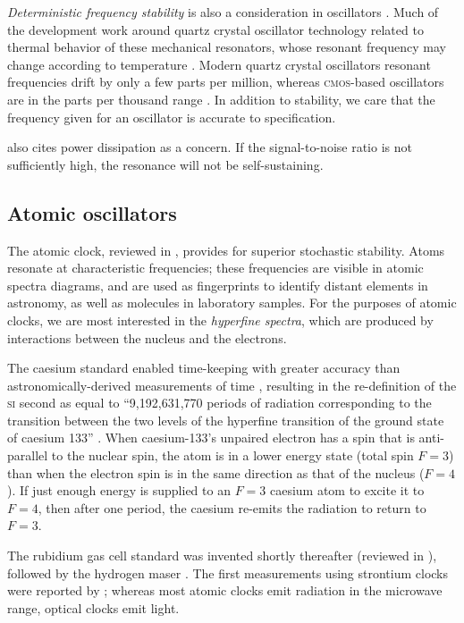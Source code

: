 \documentclass[12pt]{article}
\begin{document}
\textit{Deterministic frequency stability} is also a consideration in oscillators \citep{VanBeek2012}. Much of the development work around quartz crystal oscillator technology related to thermal behavior of these mechanical resonators, whose resonant frequency may change according to temperature \citep{Frerking1996}. Modern quartz crystal oscillators resonant frequencies drift by only a few parts per million, whereas \textsc{cmos}-based oscillators are in the parts per thousand range \citep{VanBeek2012}. In addition to stability, we care that the frequency given for an oscillator is accurate to specification.

\citet{VanBeek2012} also cites power dissipation as a concern. If the signal-to-noise ratio is not sufficiently high, the resonance will not be self-sustaining.

\subsection{Atomic oscillators}
The atomic clock, reviewed in \citet{Vessot1989}, provides for superior stochastic stability. Atoms resonate at characteristic frequencies; these frequencies are visible in atomic spectra diagrams, and are used as fingerprints to identify distant elements in astronomy, as well as molecules in laboratory samples. For the purposes of atomic clocks, we are most interested in the \textit{hyperfine spectra}, which are produced by interactions between the nucleus and the electrons.

The caesium standard enabled time-keeping with greater accuracy than astronomically-derived measurements of time \citep{Essen1955}, resulting in the re-definition of the \textsc{si} second as equal to ``9,192,631,770 periods of radiation corresponding to the transition between the two levels of the hyperfine transition of the ground state of caesium 133'' \citep{BIPM1967}. When caesium-133's unpaired electron has a spin that is anti-parallel to the nuclear spin, the atom is in a lower energy state (total spin $F = 3$) than when the electron spin is in the same direction as that of the nucleus ($F = 4$). If just enough energy is supplied to an $F=3$ caesium atom to excite it to $F=4$, then after one period, the caesium re-emits the radiation to return to $F=3$.

The rubidium gas cell standard was invented shortly thereafter (reviewed in \citet{Riley2019}), followed by the hydrogen maser \citep{Goldenberg1960}. The first measurements using strontium clocks were reported by \citet{Campbell2017}; whereas most atomic clocks emit radiation in the microwave range, optical clocks emit light.
\end{document}
